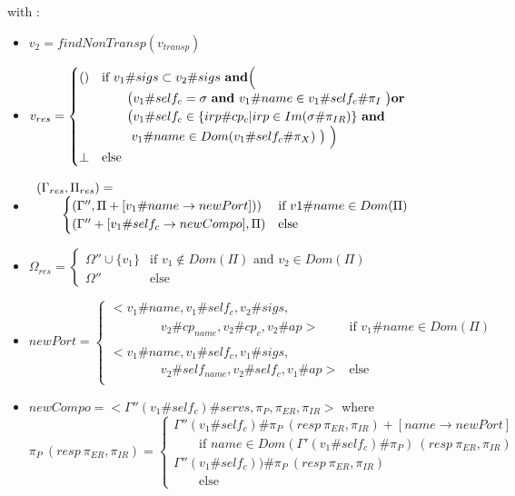 \begin{figure}[ht!]
{{\begin{prooftree}
\end{prooftree}
\hspace{0.2cm} with :
\begin{itemize}
\item $v_2  =findNonTransp(v_{transp})$
\item $v_{res}= \begin{cases} 
() & \text{if $v_1\#sigs \subset v_2\#sigs$ \textbf{and}\Big(} \\ 
&\qquad \text{\big($v_1\#self_c= \sigma$  \textbf{and} $v_1\#name \in v_1\#self_c\#\pi_I$ \big)\textbf{or}} \\
&\qquad \text{\big($v_1\#self_c \in \{irp\#cp_c | irp \in Im(\sigma\#\pi_{IR})\}$ \textbf{and}}  \\
&\qquad \text{ $v_1\#name \in Dom(v_1\#self_c\#\pi_{X})  $ \big) \Big)}\\
\perp & \text{else}
\end{cases}
$
\item
 $\begin{array}{l}(\Envswso{_{res}}) =\\
\qquad 
 \begin{cases}
(\EnvswsoPers{''}{ + [v_1\#name \rightarrow newPort])}) &\text{if $v1\#name \in Dom(\Pi)$}
\\
(\EnvswsoPers{'' + [v_1\#self_c \rightarrow newCompo]}{}) &\text{else}
\end{cases}\end{array}$

\item $\Omega_{res} = \begin{cases}
\Omega'' \cup \{v_1\} & \text{if } v_1\notin Dom(\Pi)\text{ and } v_2 \in Dom(\Pi)\\
\Omega'' & \text{else}
\end{cases}
$

\item $newPort = \begin{cases}<v_1\#name,v_1\#self_c,v_2\#sigs,&\\
\qquad \qquad  v_2\#cp_{name}, v_2\#cp_c,v_2\#ap>& \text{if }v_1\#name \in Dom(\Pi)\\
\\
<v_1\#name,v_1\#self_c,v_1\#sigs,&\\
\qquad \qquad  v_2\#self_{name}, v_2\#self_c,v_1\#ap>& \text{else}\\




\end{cases} $
\item $newCompo = <\Gamma''(v_1\#self_c)\#servs,\pi_P,\pi_{ER}, \pi_{IR}>$
where \[\pi_P~(resp~\pi_{ER},\pi_{IR})= \begin{cases}
\Gamma''(v_1\#self_c)\#\pi_P~(resp~\pi_{ER},\pi_{IR}) + [name \rightarrow newPort]&\\
\qquad \text{if $name\in Dom(\Gamma'(v_1\#self_c)\#\pi_P)~(resp~\pi_{ER},\pi_{IR})$}&\\
\Gamma''(v_1\#self_c))\#\pi_P~(resp~\pi_{ER},\pi_{IR})\\ \qquad \text{else}
\end{cases}\]
\end{itemize}

}}
\end{figure}
